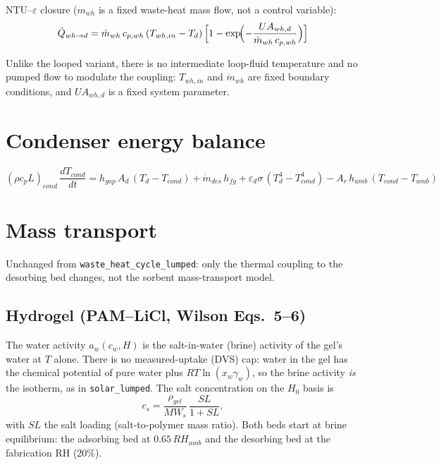 \documentclass[11pt]{article}
\begin{document}
NTU--$\varepsilon$ closure ($\dot{m}_{wh}$ is a fixed waste-heat mass flow, not a control variable):
\begin{equation}
\dot{Q}_{wh\to d} = \dot{m}_{wh}\,c_{p,wh}\,(T_{wh,in} - T_d)\,\Bigl[1-\exp\!\Bigl(-\frac{UA_{wh,d}}{\dot{m}_{wh}\,c_{p,wh}}\Bigr)\Bigr]
\label{eq:Qwhd}
\end{equation}

Unlike the looped variant, there is no intermediate loop-fluid temperature and no pumped flow to modulate the coupling: $T_{wh,in}$ and $\dot{m}_{wh}$ are fixed boundary conditions, and $UA_{wh,d}$ is a fixed system parameter.

\section{Condenser energy balance}

\begin{equation}
(\rho c_p L)_{cond}\,\frac{dT_{cond}}{dt}
= h_{gap}\,A_d\,(T_d - T_{cond})
+ \dot{m}_{des}\,h_{fg}
+ \varepsilon_d\sigma\,(T_d^4 - T_{cond}^4)
- A_r\,h_{amb}\,(T_{cond} - T_{amb})
\label{eq:condenser}
\end{equation}

\section{Mass transport}

Unchanged from \texttt{waste\_heat\_cycle\_lumped}: only the thermal coupling to the desorbing bed changes, not the sorbent mass-transport model.

\subsection{Hydrogel (PAM--LiCl, Wilson Eqs.~5--6)}

The water activity $a_w(c_w, H)$ is the salt-in-water (brine) activity of the gel's water at
$T$ alone. There is no measured-uptake (DVS) cap: water in the gel has the chemical potential
of pure water plus $RT\ln(x_w\gamma_w)$, so the brine activity \emph{is} the isotherm, as in
\texttt{solar\_lumped}. The salt concentration on the $H_0$ basis is
\begin{equation}
c_s = \frac{\rho_{gel}}{MW_s}\,\frac{SL}{1+SL},
\label{eq:cs}
\end{equation}
with $SL$ the salt loading (salt-to-polymer mass ratio). Both beds start at brine
equilibrium: the adsorbing bed at $0.65\,RH_{amb}$ and the desorbing bed at the fabrication
RH (20\%).
\end{document}
